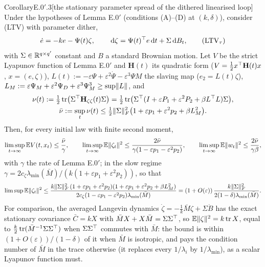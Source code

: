 \begin{thm}{Corollary}{E.0$'$.3}[the stationary parameter spread of the dithered linearised loop]
Under the hypotheses of Lemma E.0$'$ (conditions (A)--(D) at $(k,\delta)$), consider \textup{(LTV)} with parameter
dither,
\begin{equation}
  \dot e=-ke-\Psi(t)\zeta,\qquad \,\mathrm{d}\zeta=\Psi(t)^\top e\,\mathrm{d} t+\Sigma\,\mathrm{d} B_t,
  \tag{LTV$_\tau$}
\end{equation}
with $\Sigma\in\mathbb{R}^{q\times q'}$ constant and $B$ a standard Brownian motion. Let $V$ be the strict Lyapunov function of
Lemma E.0$'$ and $\mathbf{H}(t)$ its quadratic form ($V=\frac12x^\top\mathbf{H}(t)x$, $x=(e,\zeta)$),
$L(t):=-\varepsilon\Psi+\varepsilon^2\dot\Psi-\varepsilon^3\Psi M$ the slaving map ($e_2=L(t)\zeta$),
$L_M:=\varepsilon\Psi_M+\varepsilon^2\Psi_D+\varepsilon^3\Psi_M^3\ge\sup\lVert L\rVert$, and
\begin{gather*}
  \nu(t):=\tfrac12\operatorname{tr}\bigl(\Sigma^\top\mathbf{H}_{\zeta\zeta}(t)\Sigma\bigr)
  =\tfrac12\operatorname{tr}\bigl(\Sigma^\top(I+\varepsilon P_1+\varepsilon^2P_2+\beta L^\top L)\Sigma\bigr),\\
  \bar\nu:=\sup_t\nu(t)\le\tfrac12\lVert \Sigma\rVert_F^2\bigl(1+\varepsilon p_1+\varepsilon^2p_2+\beta L_M^2\bigr).
\end{gather*}
Then, for every initial law with finite second moment,
\[
  \limsup_{t\to\infty}\mathbb{E} V(t,x_t)\le\frac{\bar\nu}{\gamma},\qquad
  \limsup_{t\to\infty}\mathbb{E}\lVert \zeta_t\rVert^2\le\frac{2\bar\nu}{\gamma(1-\varepsilon p_1-\varepsilon^2p_2)},\qquad
  \limsup_{t\to\infty}\mathbb{E}\lVert w_t\rVert^2\le\frac{2\bar\nu}{\gamma\beta},
\]
with $\gamma$ the rate of Lemma E.0$'$; in the slow regime
$\gamma=2c_\zeta\lambda_{\min}(\bar M)/(k(1+\varepsilon p_1+\varepsilon^2p_2))$, so that
\[
  \limsup\mathbb{E}\lVert \zeta_t\rVert^2\le
  \frac{k\lVert \Sigma\rVert_F^2\,(1+\varepsilon p_1+\varepsilon^2p_2)(1+\varepsilon p_1+\varepsilon^2p_2+\beta L_M^2)}
  {2c_\zeta(1-\varepsilon p_1-\varepsilon^2p_2)\lambda_{\min}(\bar M)}
  =(1+O(\varepsilon))\,\frac{k\lVert \Sigma\rVert_F^2}{2(1-\delta)\lambda_{\min}(\bar M)}.
\]
For comparison, the averaged Langevin dynamics $\dot\zeta=-\frac1k\bar M\zeta+\Sigma\dot B$ has the exact stationary
covariance $\bar C=kX$ with $\bar MX+X\bar M=\Sigma\Sigma^\top$, so $\mathbb{E}\lVert \zeta\rVert^2=k\operatorname{tr} X$, equal to
$\frac k2\operatorname{tr}(\bar M^{-1}\Sigma\Sigma^\top)$ when $\Sigma\Sigma^\top$ commutes with $\bar M$: the bound is within
$(1+O(\varepsilon))/(1-\delta)$ of it when $\bar M$ is isotropic, and pays the condition number of $\bar M$ in the
trace otherwise (it replaces every $1/\lambda_i$ by $1/\lambda_{\min}$), as a scalar Lyapunov function must.
\end{thm}

